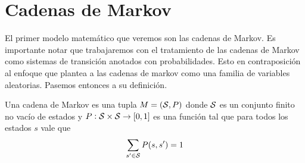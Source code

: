 












\section{Cadenas de Markov}

El primer modelo matemático que veremos son las cadenas de Markov. Es
importante notar que trabajaremos con el tratamiento de las cadenas de Markov
como sistemas de transición anotados con probabilidades. Esto en contraposición
al enfoque que plantea a las cadenas de markov como una familia de variables
aleatorias. Pasemos entonces a su definición.

\begin{definition}
	Una cadena de Markov es una tupla $M = (\mathcal{S}, P)$ donde $\mathcal{S}$ es un conjunto finito no vacío de estados y $P: \mathcal{S} \times \mathcal{S} \rightarrow [0,1]$ es una función tal que para todos los estados $s$ vale que
	$$ \sum_{s' \in \mathcal{S}} P(s, s') = 1$$
\end{definition}

